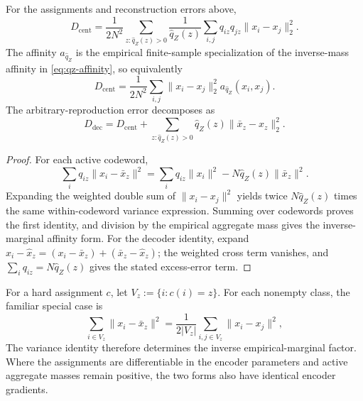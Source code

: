 \begin{proposition}
\label{prop:centroid-pairwise}
For the assignments and reconstruction errors above,
\begin{equation}
D_{\mathrm{cent}}
=\frac1{2N^2}
\sum_{z:\hat q_Z(z)>0}\frac1{\hat q_Z(z)}
\sum_{i,j}q_{iz}q_{jz}\|x_i-x_j\|_2^2.
\label{eq:finite-soft-pairwise}
\end{equation}
The affinity $a_{\hat q_Z}$ is the empirical finite-sample specialization of the inverse-mass affinity in \cref{eq:qz-affinity}, so equivalently
\begin{equation}
D_{\mathrm{cent}}=\frac1{2N^2}\sum_{i,j}
\|x_i-x_j\|_2^2a_{\hat q_Z}(x_i,x_j).
\label{eq:finite-soft-qz-normalized}
\end{equation}
The arbitrary-reproduction error decomposes as
\begin{equation}
D_{\mathrm{dec}}
=D_{\mathrm{cent}}
+\sum_{z:\hat q_Z(z)>0}
\hat q_Z(z)\|\bar x_z-\widehat x_z\|_2^2.
\label{eq:decoder-centroid-decomposition}
\end{equation}
\end{proposition}

\begin{proof}
For each active codeword,
\begin{equation}
\sum_iq_{iz}\|x_i-\bar x_z\|^2
=\sum_iq_{iz}\|x_i\|^2
-N\hat q_Z(z)\|\bar x_z\|^2.
\end{equation}
Expanding the weighted double sum of $\|x_i-x_j\|^2$ yields twice $N\hat q_Z(z)$ times the same within-codeword variance expression.
Summing over codewords proves the first identity, and division by the empirical aggregate mass gives the inverse-marginal affinity form.
For the decoder identity, expand $x_i-\widehat x_z=(x_i-\bar x_z)+(\bar x_z-\widehat x_z)$; the weighted cross term vanishes, and $\sum_iq_{iz}=N\hat q_Z(z)$ gives the stated excess-error term.
\end{proof}

For a hard assignment $c$, let $V_z:=\{i:c(i)=z\}$.
For each nonempty class, the familiar special case is
\begin{equation}
\sum_{i\in V_z}\|x_i-\bar x_z\|^2
=\frac1{2|V_z|}\sum_{i,j\in V_z}\|x_i-x_j\|^2,
\label{eq:vq-pairwise}
\end{equation}
The variance identity therefore determines the inverse empirical-marginal factor.
Where the assignments are differentiable in the encoder parameters and active aggregate masses remain positive, the two forms also have identical encoder gradients.

